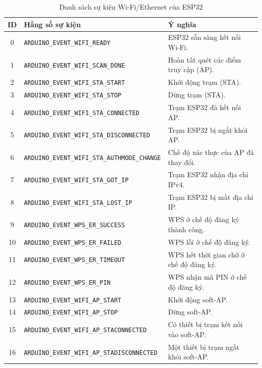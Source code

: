 \begin{table}[H]
	\centering
	\caption{Danh sách sự kiện Wi-Fi/Ethernet của ESP32}
	\label{tab:esp32_wifi_events}
	\begin{tabular}{|c|l|p{7.2cm}|}
		\hline
		\textbf{ID} & \textbf{Hằng số sự kiện} & \textbf{Ý nghĩa} \\
		\hline
		0 & \texttt{ARDUINO\_EVENT\_WIFI\_READY} & ESP32 sẵn sàng kết nối Wi-Fi. \\
		\hline
		1 & \texttt{ARDUINO\_EVENT\_WIFI\_SCAN\_DONE} & Hoàn tất quét các điểm truy cập (AP). \\
		\hline
		2 & \texttt{ARDUINO\_EVENT\_WIFI\_STA\_START} & Khởi động trạm (STA). \\
		\hline
		3 & \texttt{ARDUINO\_EVENT\_WIFI\_STA\_STOP} & Dừng trạm (STA). \\
		\hline
		4 & \texttt{ARDUINO\_EVENT\_WIFI\_STA\_CONNECTED} & Trạm ESP32 đã kết nối AP. \\
		\hline
		5 & \texttt{ARDUINO\_EVENT\_WIFI\_STA\_DISCONNECTED} & Trạm ESP32 bị ngắt khỏi AP. \\
		\hline
		6 & \texttt{ARDUINO\_EVENT\_WIFI\_STA\_AUTHMODE\_CHANGE} & Chế độ xác thực của AP đã thay đổi. \\
		\hline
		7 & \texttt{ARDUINO\_EVENT\_WIFI\_STA\_GOT\_IP} & Trạm ESP32 nhận địa chỉ IPv4. \\
		\hline
		8 & \texttt{ARDUINO\_EVENT\_WIFI\_STA\_LOST\_IP} & Trạm ESP32 bị mất địa chỉ IP. \\
		\hline
		9 & \texttt{ARDUINO\_EVENT\_WPS\_ER\_SUCCESS} & WPS ở chế độ đăng ký thành công. \\
		\hline
		10 & \texttt{ARDUINO\_EVENT\_WPS\_ER\_FAILED} & WPS lỗi ở chế độ đăng ký. \\
		\hline
		11 & \texttt{ARDUINO\_EVENT\_WPS\_ER\_TIMEOUT} & WPS hết thời gian chờ ở chế độ đăng ký. \\
		\hline
		12 & \texttt{ARDUINO\_EVENT\_WPS\_ER\_PIN} & WPS nhận mã PIN ở chế độ đăng ký. \\
		\hline
		13 & \texttt{ARDUINO\_EVENT\_WIFI\_AP\_START} & Khởi động soft-AP. \\
		\hline
		14 & \texttt{ARDUINO\_EVENT\_WIFI\_AP\_STOP} & Dừng soft-AP. \\
		\hline
		15 & \texttt{ARDUINO\_EVENT\_WIFI\_AP\_STACONNECTED} & Có thiết bị trạm kết nối vào soft-AP. \\
		\hline
		16 & \texttt{ARDUINO\_EVENT\_WIFI\_AP\_STADISCONNECTED} & Một thiết bị trạm ngắt khỏi soft-AP. \\

\end{tabular}
\end{table}
